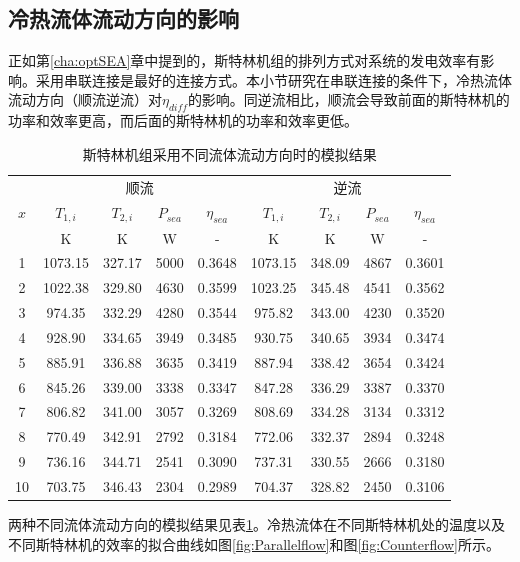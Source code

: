 \subsection{冷热流体流动方向的影响}

正如第\ref{cha:optSEA}章中提到的，斯特林机组的排列方式对系统的发电效率有影响。采用串联连接是最好的连接方式。本小节研究在串联连接的条件下，冷热流体流动方向（顺流逆流）对$\eta_{diff}$的影响。同逆流相比，顺流会导致前面的斯特林机的功率和效率更高，而后面的斯特林机的功率和效率更低。

\begin{table}[htbp]
\setlength{\abovecaptionskip}{-10pt}
	\caption{斯特林机组采用不同流体流动方向时的模拟结果}
	\begin{center}
	\begin{tabular}{ccccccccc}
		\toprule
		\multirow{3}{*}{$x$}	&	\multicolumn{4}{c}{顺流}	&\multicolumn{4}{c}{逆流}\tabularnewline
		\cline{2-5}	\cline{6-9}
		&$T_{1,i}$&$T_{2,i}$&$P_{sea}$&$\eta_{sea}$&$T_{1,i}$&$T_{2,i}$&$P_{sea}$&$\eta_{sea}$\tabularnewline
		&K&K&W&-&K&K&W&-\tabularnewline
		\midrule
		1	&	1073.15	&	327.17	&	5000	&	0.3648	&	1073.15	&	348.09	&	4867	&	0.3601\\
		2	&	1022.38	&	329.80	&	4630	&	0.3599	&	1023.25	&	345.48	&	4541	&	0.3562\\
		3	&	974.35	&	332.29	&	4280	&	0.3544	&	975.82	&	343.00	&	4230	&	0.3520\\
		4	&	928.90	&	334.65	&	3949	&	0.3485	&	930.75	&	340.65	&	3934	&	0.3474\\
		5	&	885.91	&	336.88	&	3635	&	0.3419	&	887.94	&	338.42	&	3654	&	0.3424\\
		6	&	845.26	&	339.00	&	3338	&	0.3347	&	847.28	&	336.29	&	3387	&	0.3370\\
		7	&	806.82	&	341.00	&	3057	&	0.3269	&	808.69	&	334.28	&	3134	&	0.3312\\
		8	&	770.49	&	342.91	&	2792	&	0.3184	&	772.06	&	332.37	&	2894	&	0.3248\\
		9	&	736.16	&	344.71	&	2541	&	0.3090	&	737.31	&	330.55	&	2666	&	0.3180\\
		10	&	703.75	&	346.43	&	2304	&	0.2989	&	704.37	&	328.82	&	2450	&	0.3106\\
		\bottomrule
	\end{tabular}
	\end{center}
	\label{tab:SEAresults}
\end{table}

两种不同流体流动方向的模拟结果见表\ref{tab:SEAresults}。冷热流体在不同斯特林机处的温度以及不同斯特林机的效率的拟合曲线如图\ref{fig:Parallelflow}和图\ref{fig:Counterflow}所示。

